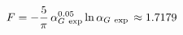 \begin{equation}
 F = -{5\over\pi}\,\alpha_{G\ \mathrm{exp}}^{0.05}
      \ln{\alpha_{G\ \mathrm{exp}}}
   \, \approx 1.7179
 \label{eq:39}
 \end{equation}

